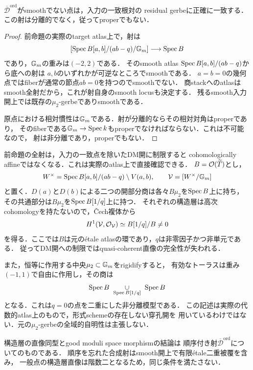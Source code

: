 \begin{corollary}
\label{cor:qa-fricke-nonsmooth-nonseparated}
$\overline{\mathscr D}^{\mathrm{ord}}$がsmoothでない点は，入力の一致根対の
residual gerbeに正確に一致する．この射は分離的でなく，従ってproperでもない．
\end{corollary}
\begin{proof}
前命題の実際のtarget atlas上で，射は
\[
 [\operatorname{Spec} B[a,b]/(ab-q)/\mathbb G_m]\longrightarrow\operatorname{Spec} B
\]
であり，$\mathbb G_m$の重みは$(-2,2)$である．
そのsmooth atlas $\operatorname{Spec} B[a,b]/(ab-q)$から底への射は
$a,b$のいずれかが可逆なところでsmoothである．
$a=b=0$の幾何点ではfiberが通常の節点$ab=0$を持つのでsmoothでない．
商stackへのatlasはsmooth全射だから，これが射自身のsmooth locusも決定する．
残るsmooth入力開上では既存の$\mu_2$-gerbeでありsmoothである．

原点における相対慣性は$\mathbb G_m$である．射が分離的ならその相対対角はproperであり，
そのfiberである$\mathbb G_m\to\operatorname{Spec} k$もproperでなければならない．これは不可能なので，
射は非分離であり，properでもない．
\end{proof}

\begin{remark}[一致点を除くと直像の完全性を失う]
\label{rem:qa-fricke-dm-open-doubled-origin}
前命題の全射は，入力の一致点を除いたDM開に制限すると
cohomologically affineではなくなる．これは実際のatlas上で直接確認できる．
$B=\mathcal O(\widetilde T)$とし，
\[
 W^\times=\operatorname{Spec} B[a,b]/(ab-q)\setminus V(a,b),\qquad
 \mathcal V=[W^\times/\mathbb G_m]
\]
と置く．$D(a)$と$D(b)$による二つの開部分商は各々$B\mu_2$を$\operatorname{Spec} B$上に持ち，
その共通部分は$B\mu_2$を$\operatorname{Spec} B[1/q]$上に持つ．
それぞれの構造層は高次cohomologyを持たないので，\v Cech複体から
\[
 H^1(\mathcal V,\mathcal O_{\mathcal V})
       \simeq B[1/q]/B\ne0
\]
を得る．ここでは$B$は元の\'etale atlasの環であり，$q$は非零因子かつ非単元である．
従ってDM開への制限ではquasi-coherent直像の完全性が失われる．

また，恒等に作用する中央$\mu_2\subset\mathbb G_m$をrigidifyすると，
有効なトーラスは重み$(-1,1)$で自由に作用し，その商は
\[
 \Spec B\ \underset{\Spec B[1/q]}{\cup}\ \Spec B
\]
となる．これは$q=0$の点を二重にした非分離模型である．
この記述は実際の代数的atlas上のもので，形式schemeの存在しない穿孔開を
用いているわけではない．元の$\mu_2$-gerbeの全域的自明性は主張しない．
\end{remark}

\begin{remark}[順序付き射と順序忘却]
構造層の直像同型とgood moduli space morphismの結論は
順序付き射$\overline{\mathscr D}^{\mathrm{ord}}$についてのものである．
順序を忘れた合成射はsmooth開上で有限\'etale二重被覆を含み，
一般点の構造層直像は階数二となるため，同じ条件を満たさない．
\end{remark}
